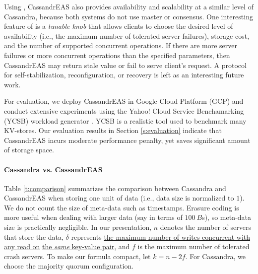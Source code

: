 Using \oreas{}, CassandrEAS also provides availability and scalability at a similar level of Cassandra, because both systems do not use master or consensus.
One interesting feature of \oreas{} is a \textit{tunable knob} that allows clients to choose the desired level of availability (i.e., the maximum number of tolerated server failures), storage cost, and the number of supported concurrent operations. If there are more server failures or more concurrent operations than the specified parameters, then CassandrEAS may return stale value or fail to serve client's request. A protocol for self-stabilization, reconfiguration, or recovery is left as an interesting future work.

For evaluation, we deploy CassandrEAS in Google Cloud Platform (GCP) and conduct extensive experiments using the Yahoo! Cloud Service Benchamarking (YCSB) workload generator \cite{YCSB:2010}. YCSB is a realistic tool used to benchmark many KV-stores.
Our evaluation results in Section \ref{s:evaluation} indicate that CassandrEAS incurs moderate performance penalty, yet saves significant amount of storage space.

\paragraph*{Cassandra vs. CassandrEAS}
Table \ref{t:comparison} summarizes the comparison between Cassandra and CassandrEAS when storing one unit of data (i.e., data size is normalized to $1$). We do not count the size of meta-data such as timestamps. Erasure coding is more useful when dealing with larger data (say in terms of $100~B$s), so meta-data size is practically negligible. 
In our presentation, $n$ denotes the number of servers that store the data, $\delta$ represents \underline{the maximum number of writes concurrent with any read on} \underline{the \textit{same} key-value pair}, and $f$ is the maximum number of tolerated crash servers.
To make our formula compact, let $k = n-2f$. For Cassandra, we choose the majority quorum configuration.

